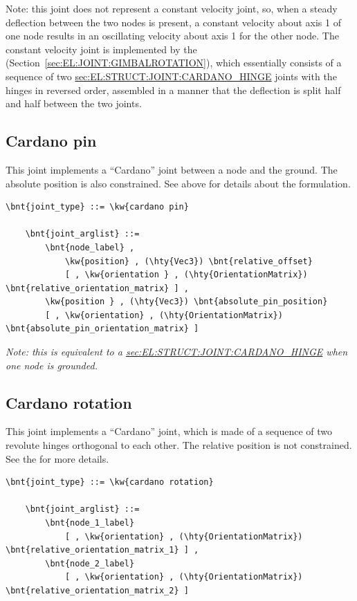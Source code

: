 Note: this joint does not represent a constant velocity joint,
so, when a steady deflection between the two nodes is present,
a constant velocity about axis 1 of one node results in an oscillating
velocity about axis 1 for the other node.
The constant velocity joint is implemented by the 
(Section~\ref{sec:EL:JOINT:GIMBALROTATION}), which essentially consists
of a sequence of two
\hyperref{\kw{cardano hinge}}{\kw{cardano hinge} (see Section~}{)}{sec:EL:STRUCT:JOINT:CARDANO_HINGE}
joints with the hinges in reversed order, assembled
in a manner that the deflection is split half and half
between the two joints.

\subsection{Cardano pin}
\label{sec:EL:STRUCT:JOINT:CARDANO_PIN}
This joint implements a ``Cardano'' joint between a node and the ground.
The absolute position is also constrained.
See above for details about the formulation.
\begin{Verbatim}[commandchars=\\\{\}]
    \bnt{joint_type} ::= \kw{cardano pin}

    \bnt{joint_arglist} ::= 
        \bnt{node_label} ,
            \kw{position} , (\hty{Vec3}) \bnt{relative_offset}
            [ , \kw{orientation } , (\hty{OrientationMatrix}) \bnt{relative_orientation_matrix} ] ,
        \kw{position } , (\hty{Vec3}) \bnt{absolute_pin_position}
        [ , \kw{orientation} , (\hty{OrientationMatrix}) \bnt{absolute_pin_orientation_matrix} ]
\end{Verbatim}
\emph{Note: this is equivalent to a
\hyperref{\kw{cardano hinge}}{\kw{cardano hinge} (see Section~}{)}{sec:EL:STRUCT:JOINT:CARDANO_HINGE}
when one node is grounded.
}

\subsection{Cardano rotation}
\label{sec:EL:STRUCT:JOINT:CARDANO_ROTATION}
This joint implements a ``Cardano'' joint, which is made of a sequence
of two revolute hinges orthogonal to each other.
The relative position is not constrained.
See the  for more details.
\begin{Verbatim}[commandchars=\\\{\}]
    \bnt{joint_type} ::= \kw{cardano rotation}

    \bnt{joint_arglist} ::= 
        \bnt{node_1_label}
            [ , \kw{orientation} , (\hty{OrientationMatrix}) \bnt{relative_orientation_matrix_1} ] ,
        \bnt{node_2_label}
            [ , \kw{orientation} , (\hty{OrientationMatrix}) \bnt{relative_orientation_matrix_2} ]
\end{Verbatim}

